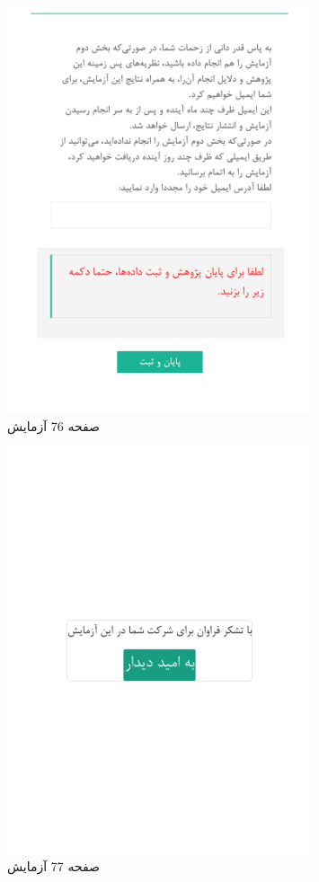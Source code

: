 { 
\begin{figure}[htpb]
\centering
\includegraphics[width=0.8\textwidth]{./img/Task76.png/}
\caption{ صفحه 76 آزمایش }
\label{fig:Task76}
\end{figure}
 
 
\begin{figure}[htpb]
\centering
\includegraphics[width=0.8\textwidth]{./img/Task77.png/}
\caption{ صفحه 77 آزمایش }
\label{fig:Task77}
\end{figure}
 
 
}
